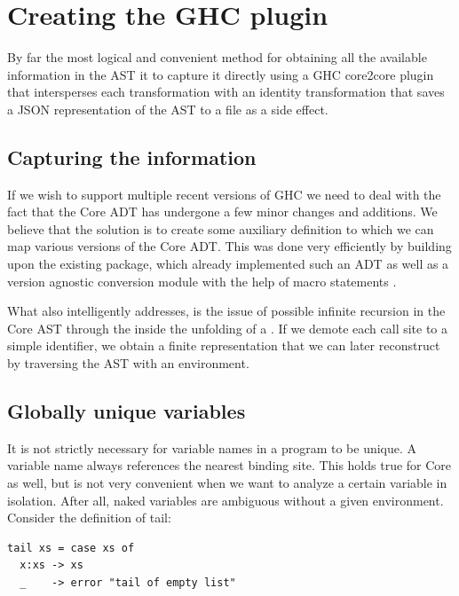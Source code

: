 \section{Creating the GHC plugin}

By far the most logical and convenient method for obtaining all the available information in the AST it to capture
it directly using a GHC core2core plugin that intersperses each transformation with an identity transformation that
saves a JSON representation of the AST to a file as a side effect. 

\subsection{Capturing the information}

If we wish to support multiple recent versions of GHC we need to deal with the fact that the Core ADT has undergone
a few minor changes and additions. We believe that the solution is to create some auxiliary definition to which we can
map various versions of the Core ADT. This was done very efficiently by building upon the existing  package,
which already implemented such an ADT as well as a version agnostic conversion module with the help of 
macro statements \cite{ghc_dump}. 

What  also intelligently addresses, is the issue of possible infinite recursion
in the Core AST through the  inside the unfolding of a . If we demote each
call site to a simple identifier, we obtain a finite representation that we can later reconstruct by traversing
the AST with an environment.

\subsection{Globally unique variables}

It is not strictly necessary for variable names in a program to be unique. A variable name always
references the nearest binding site. This holds true for Core as well, but is not very convenient
when we want to analyze a certain variable in isolation. After all, naked variables are ambiguous without a given
environment. Consider the definition of tail:

\begin{listing}[H]
\begin{verbatim}
tail xs = case xs of
  x:xs -> xs
  _    -> error "tail of empty list"
\end{verbatim}
\end{listing}


